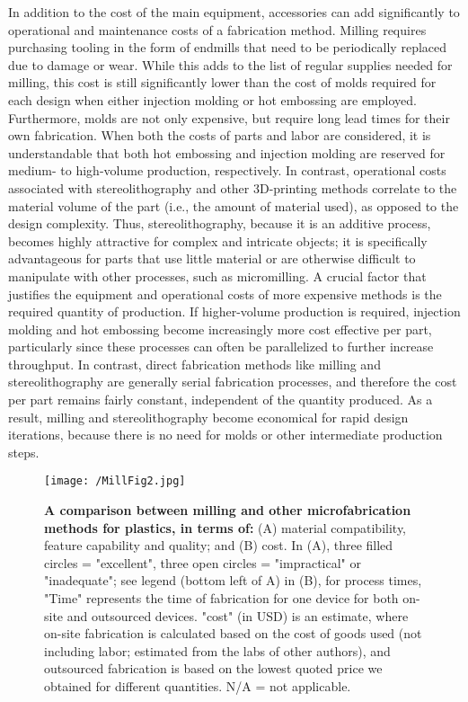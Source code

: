 In addition to the cost of the main equipment, accessories can add significantly to operational and maintenance costs of a fabrication method. Milling requires purchasing tooling in the form of endmills that need to be periodically replaced due to damage or wear. While this adds to the list of regular supplies needed for milling, this cost is still significantly lower than the cost of molds required for each design when either injection molding or hot embossing are employed. Furthermore, molds are not only expensive, but require long lead times for their own fabrication. When both the costs of parts and labor are considered, it is understandable that both hot embossing and injection molding are reserved for medium- to high-volume production, respectively. In contrast, operational costs associated with stereolithography and other 3D-printing methods correlate to the material volume of the part (i.e., the amount of material used), as opposed to the design complexity. Thus, stereolithography, because it is an additive process, becomes highly attractive for complex and intricate objects; it is specifically advantageous for parts that use little material or are otherwise difficult to manipulate with other processes, such as micromilling. 
A crucial factor that justifies the equipment and operational costs of more expensive methods is the required quantity of production. If higher-volume production is required, injection molding and hot embossing become increasingly more cost effective per part, particularly since these processes can often be parallelized to further increase throughput. In contrast, direct fabrication methods like milling and stereolithography are generally serial fabrication processes, and therefore the cost per part remains fairly constant, independent of the quantity produced. As a result, milling and stereolithography become economical for rapid design iterations, because there is no need for molds or other intermediate production steps.

\begin{figure}[h!] %
\centering
\texttt{[image: /MillFig2.jpg]}
\caption{\textbf{A comparison between milling and other microfabrication methods for plastics, in terms of:} (A) material compatibility, feature capability and quality; and (B) cost. In (A), three filled circles = "excellent", three open circles = "impractical" or "inadequate"; see legend (bottom left of A) in (B), for process times, "Time" represents the time of fabrication for one device for both on-site and outsourced devices. "cost" (in USD) is an estimate, where on-site fabrication is calculated based on the cost of goods used (not including labor; estimated from the labs of other authors), and outsourced fabrication is based on the lowest quoted price we obtained for different quantities. N/A = not applicable.}
\label{figure:MillFig2}
\end{figure}

